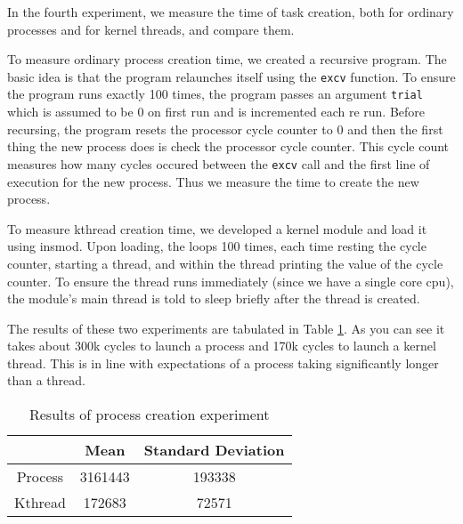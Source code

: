 In the fourth experiment, we measure the time of task creation, both for ordinary processes and for kernel threads, and compare them.

To measure ordinary process creation time, we created a recursive program.
The basic idea is that the program relaunches itself using the {\tt excv} function.  
To ensure the program runs exactly 100 times, the program passes an argument {\tt trial} which is assumed to be 0 on first run and is incremented each re run.
Before recursing, the program resets the processor cycle counter to 0 and then the first thing the new process does is check the processor cycle counter.
This cycle count measures how many cycles occured between the {\tt excv} call and the first line of execution for the new process.
Thus we measure the time to create the new process.

To measure kthread creation time, we developed a kernel module and load it using insmod.
Upon loading, the loops 100 times, each time resting the cycle counter, starting a thread, and within the thread printing the value of the cycle counter.
To ensure the thread runs immediately (since we have a single core cpu), the module's main thread is told to sleep briefly after the thread is created.

The results of these two experiments are tabulated in Table \ref{tab:exp1_4}.
As you can see it takes about 300k cycles to launch a process and 170k cycles to launch a kernel thread.
This is in line with expectations of a process taking significantly longer than a thread.

\begin{table}
\begin{tabular}{|c|c|c|}\hline
& Mean & Standard Deviation \\\hline
Process &  3161443 & 193338 \\
Kthread & 172683 & 72571 \\\hline
\end{tabular}
\caption{Results of process creation experiment}\label{tab:exp1_4}
\end{table}